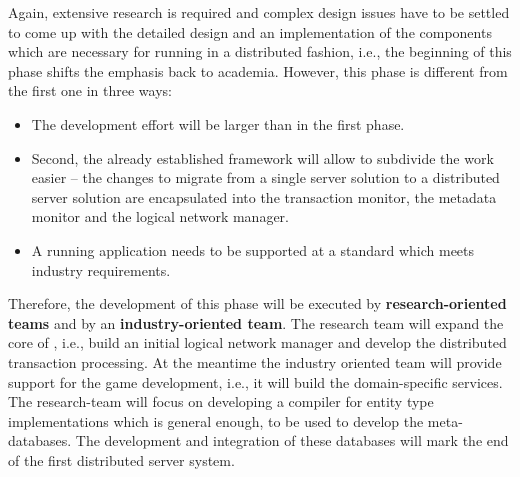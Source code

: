 \documentclass[a4paper, 10pt]{book}
\begin{document}
                                        Again, extensive research is required and complex design issues have
                                        to be settled to come up with the detailed design and an
                                        implementation of the components which are necessary for running \SYNEIGHT
                                        in a distributed fashion, i.e., the beginning of this phase shifts the
                                        emphasis back to academia.
                                        However, this phase is different from the first one in three ways:
                                        \begin{itemize}
                                            \item The development effort will be larger than in the first phase. 
                                            \item Second, the already established framework will allow to
                                                subdivide the work easier -- the changes to migrate \SYNEIGHT from a
                                                single server solution to a distributed server solution are
                                                encapsulated into the transaction monitor, the metadata monitor and
                                                the logical network manager.
                                            \item A running application needs to be supported at a standard which
                                                meets industry requirements.
                                        \end{itemize}
                                        Therefore, the development of this phase will be executed by
                                        \textbf{research-oriented teams} and by an \textbf{industry-oriented
                                        team}. The research team will expand the core of \SYNEIGHT, i.e., build
                                        an initial logical network manager and develop the distributed
                                        transaction processing. At the meantime the industry oriented team
                                        will provide support for the game development, i.e., it will build the
                                        domain-specific services. The research-team will focus on developing a
                                        compiler for entity type implementations which is general enough, to
                                        be used to develop the meta-databases. The development and integration
                                        of these databases will mark the end of the first distributed \SYNEIGHT
                                        server system.
\end{document}
